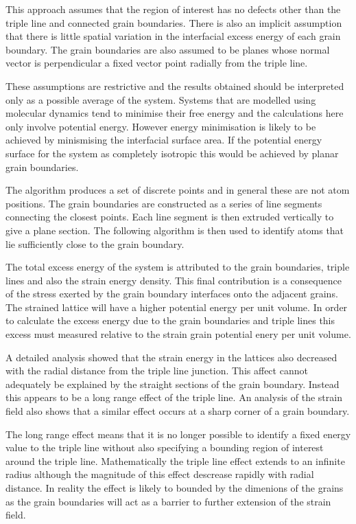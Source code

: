 \documentclass[12pt,a4paper]{book}
\begin{document}
This approach assumes that the region of interest has no defects other than the triple line and connected grain boundaries. There is also an implicit assumption that there is little spatial variation in the interfacial excess energy of each grain boundary. The grain boundaries are also assumed to be planes whose normal vector is perpendicular a fixed vector point radially from the triple line.

These assumptions are restrictive and the results obtained should be interpreted only as a possible average of the system. Systems that are modelled using molecular dynamics tend to minimise their free energy and the calculations here only involve potential energy. However energy minimisation is likely to be achieved by minismising the interfacial surface area. If the potential energy surface for the system as completely isotropic this would be achieved by planar grain boundaries.    

The algorithm produces a set of discrete points and in general these are not atom positions. The grain boundaries are constructed as a series of line segments connecting the closest points. Each line segment is then extruded vertically to give a plane section. The following algorithm is then used to identify atoms that lie sufficiently close to the grain boundary.

The total excess energy of the system is attributed to the grain boundaries, triple lines and also the strain energy density. This final contribution is a consequence of the stress exerted by the grain boundary interfaces onto the adjacent grains. The strained lattice will have a higher potential energy per unit volume. In order to calculate the excess energy due to the grain boundaries and triple lines this excess must measured relative to the strain grain potential enery per unit volume. 

A detailed analysis showed that the strain energy in the lattices also decreased with the radial distance from the triple line junction. This affect cannot adequately be explained by the straight sections of the grain boundary. Instead this appears to be a long range effect of the triple line. An analysis of the strain field also shows that a similar effect occurs at a sharp corner of a grain boundary.
 
The long range effect means that it is no longer possible to identify a fixed energy value to the triple line without also specifying a bounding region of interest around the triple line. Mathematically the triple line effect extends to an infinite radius although the magnitude of this effect descrease rapidly with radial distance. In reality the effect is likely to bounded by the dimenions of the grains as the grain boundaries will act as a barrier to further extension of the strain field. 
\end{document}
